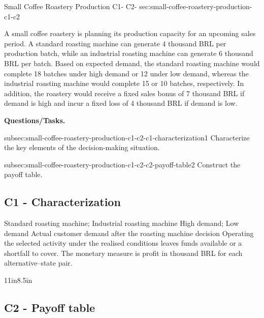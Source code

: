 {		\vspace{-5mm}
		
	}
	
	\sectionScored
	{Small Coffee Roastery Production}
	{C1- \hspace{2mm} C2-}
	{sec:small-coffee-roastery-production-c1-c2}
	{
		A small coffee roastery is planning its production capacity for an upcoming sales period. A standard roasting machine can generate 4 thousand BRL per production batch, while an industrial roasting machine can generate 6 thousand BRL per batch. Based on expected demand, the standard roasting machine would complete 18 batches under high demand or 12 under low demand, whereas the industrial roasting machine would complete 15 or 10 batches, respectively. In addition, the roastery would receive a fixed sales bonus of 7 thousand BRL if demand is high and incur a fixed loss of 4 thousand BRL if demand is low.
		
		\textbf{Questions/Tasks.}
		\begin{enumerate}
			\CriterionTask
			{subsec:small-coffee-roastery-production-c1-c2-c1-characterization}{1}
			{Characterize the key elements of the decision-making situation. }
			
			\CriterionTask
			{subsec:small-coffee-roastery-production-c1-c2-c2-payoff-table}{2}
			{Construct the payoff table. }
		\end{enumerate}
		
		\label{subsec:small-coffee-roastery-production-c1-c2-c1-characterization}
		\subsection*{C1 - Characterization }
		
		\DecisionElementsTable
{Standard roasting machine; Industrial roasting machine}
{High demand; Low demand}
{Actual customer demand after the roasting machine decision}
{Operating the selected activity under the realised conditions leaves funds available or a shortfall to cover. The monetary measure is profit in thousand BRL for each alternative--state pair.}

		
		\begin{CalculationLandscape}{11in}{8.5in}
		\label{subsec:small-coffee-roastery-production-c1-c2-c2-payoff-table}
		\subsection*{C2 - Payoff table }
		

\end{CalculationLandscape}}
